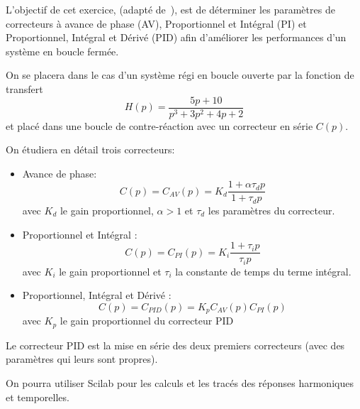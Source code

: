 L'objectif de cet exercice, (adapté de~\cite{Bourles}), est de déterminer les 
paramètres de correcteurs à avance de phase (AV), Proportionnel et Intégral (PI) 
et Proportionnel, Intégral et Dérivé (PID) afin d'améliorer les performances 
d'un système en boucle fermée.

On se placera dans le cas d'un système régi en boucle ouverte par la fonction 
de transfert
\[
    H(p)=\dfrac{5p+10}{p^3+3p^2+4p+2}
\]
et placé dans une boucle de contre-réaction avec un correcteur en série $C(p)$.
\begin{center}
    
\end{center}
On étudiera en détail trois correcteurs:
\begin{itemize}
    \item Avance de phase: 
\[
    C(p)=C_{AV}(p)=K_d\dfrac{1+\alpha\tau_d p}{1+\tau_d p}
\]
    avec $K_d$ le gain proportionnel, $\alpha>1$ et $\tau_d$ les paramètres 
    du correcteur.
    \item Proportionnel et Intégral : 
\[ 
        C(p)=C_{PI}(p)=K_i\dfrac{1+\tau_i p}{\tau_i p}
\]
    avec $K_i$ le gain proportionnel et $\tau_i$ la constante de temps du 
    terme intégral.
    \item Proportionnel, Intégral et Dérivé : 
\[
    C(p)=C_{PID}(p)=K_pC_{AV}(p)C_{PI}(p)
\]
    avec $K_p$ le gain proportionnel du correcteur PID
\end{itemize}
Le correcteur PID est la mise en série des deux premiers correcteurs 
(avec des paramètres qui leurs sont propres).

On pourra utiliser Scilab pour les calculs et les tracés des réponses 
harmoniques et temporelles.
\clearpage
